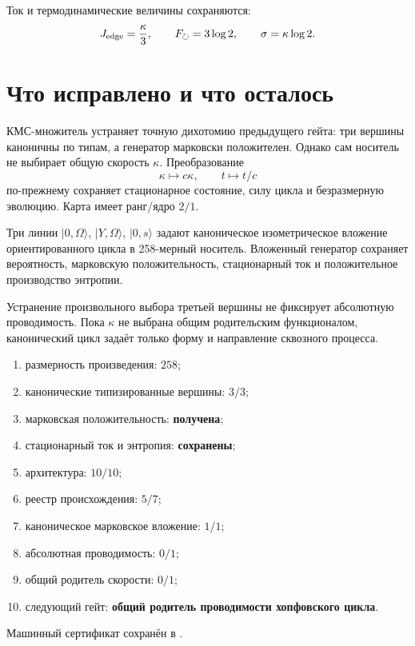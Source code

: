 Ток и термодинамические величины сохраняются:
\begin{equation}
 J_{\rm edge}=\frac\kappa3,
 \qquad F_\circlearrowright=3\log2,
 \qquad \sigma=\kappa\log2.
 \label{eq:v10-hopf-product-current}
\end{equation}

\section{Что исправлено и что осталось}

КМС-множитель устраняет точную дихотомию предыдущего гейта: три вершины
каноничны по типам, а генератор марковски положителен. Однако сам носитель
не выбирает общую скорость $\kappa$. Преобразование
\begin{equation}
 \kappa\mapsto c\kappa,
 \qquad t\mapsto t/c
\end{equation}
по-прежнему сохраняет стационарное состояние, силу цикла и безразмерную
эволюцию. Карта имеет ранг/ядро $2/1$.

\begin{theorem}
Три линии $|0,\Omega\rangle$, $|Y,\Omega\rangle$, $|0,s\rangle$ задают
каноническое изометрическое вложение ориентированного цикла в 258-мерный
носитель. Вложенный генератор сохраняет вероятность, марковскую
положительность, стационарный ток и положительное производство энтропии.
\end{theorem}

\begin{nogocriterion}
Устранение произвольного выбора третьей вершины не фиксирует абсолютную
проводимость. Пока $\kappa$ не выбрана общим родительским функционалом,
канонический цикл задаёт только форму и направление сквозного процесса.
\end{nogocriterion}

\begin{protocol}\begin{enumerate}
\item размерность произведения: \textbf{$258$};
\item канонические типизированные вершины: \textbf{$3/3$};
\item марковская положительность: \textbf{получена};
\item стационарный ток и энтропия: \textbf{сохранены};
\item архитектура: \textbf{$10/10$};
\item реестр происхождения: \textbf{$5/7$};
\item каноническое марковское вложение: \textbf{$1/1$};
\item абсолютная проводимость: \textbf{$0/1$};
\item общий родитель скорости: \textbf{$0/1$};
\item следующий гейт: \textbf{общий родитель проводимости хопфовского цикла}.
\end{enumerate}\end{protocol}

Машинный сертификат сохранён в
.